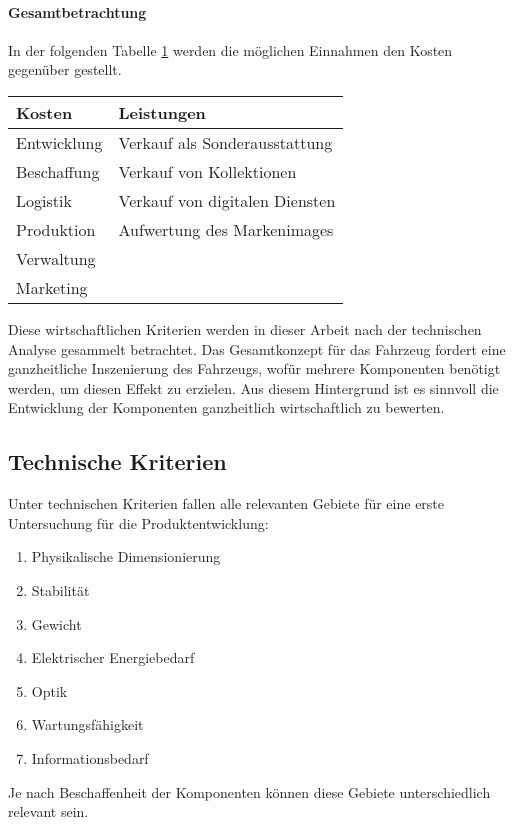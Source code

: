 \paragraph{Gesamtbetrachtung}
In der folgenden Tabelle \ref{tab:Kosten} werden die möglichen Einnahmen den Kosten gegenüber gestellt.
\begin{table}[hbt]	
	\centering
	\renewcommand{\arraystretch}{1.5}	%
	\label{tab:Kosten}
	\begin{tabular}{l|l}
		\textbf{Kosten} & \textbf{Leistungen} \\ 
		\hline
		\hline
		Entwicklung & Verkauf als Sonderausstattung \\
		Beschaffung &  Verkauf von Kollektionen \\
		Logistik & Verkauf von digitalen Diensten \\
		Produktion & Aufwertung des Markenimages \\
		Verwaltung & \\
		Marketing & \\
	\end{tabular} 
\end{table}
Diese wirtschaftlichen Kriterien werden in dieser Arbeit nach der technischen Analyse gesammelt betrachtet. Das Gesamtkonzept für das Fahrzeug fordert eine ganzheitliche Inszenierung des Fahrzeugs, wofür mehrere Komponenten benötigt werden, um diesen Effekt zu erzielen. Aus diesem Hintergrund ist es sinnvoll die Entwicklung der Komponenten ganzheitlich wirtschaftlich zu bewerten. \\
\subsection{Technische Kriterien}
Unter technischen Kriterien fallen alle relevanten Gebiete für eine erste Untersuchung für die Produktentwicklung:
\begin{enumerate}
	\item Physikalische Dimensionierung
	\item Stabilität
	\item Gewicht
	\item Elektrischer Energiebedarf
	\item Optik
	\item Wartungsfähigkeit
	\item Informationsbedarf
\end{enumerate}
Je nach Beschaffenheit der Komponenten können diese Gebiete unterschiedlich relevant sein.
